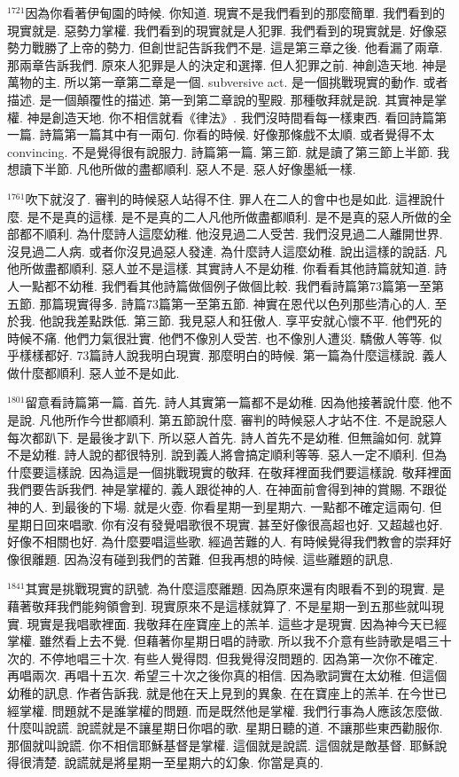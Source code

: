 \documentclass{book}
\begin{document}
$^{1721}$因為你看著伊甸園的時候.
你知道.
現實不是我們看到的那麼簡單.
我們看到的現實就是.
惡勢力掌權.
我們看到的現實就是人犯罪.
我們看到的現實就是.
好像惡勢力戰勝了上帝的勢力.
但創世記告訴我們不是.
這是第三章之後.
他看漏了兩章.
那兩章告訴我們.
原來人犯罪是人的決定和選擇.
但人犯罪之前.
神創造天地.
神是萬物的主.
所以第一章第二章是一個.
subversive act.
是一個挑戰現實的動作.
或者描述.
是一個顛覆性的描述.
第一到第二章說的聖殿.
那種敬拜就是說.
其實神是掌權.
神是創造天地.
你不相信就看《律法》.
我們沒時間看每一樣東西.
看回詩篇第一篇.
詩篇第一篇其中有一兩句.
你看的時候.
好像那條戲不太順.
或者覺得不太convincing.
不是覺得很有說服力.
詩篇第一篇.
第三節.
就是讀了第三節上半節.
我想讀下半節.
凡他所做的盡都順利.
惡人不是.
惡人好像墨紙一樣.

$^{1761}$吹下就沒了.
審判的時候惡人站得不住.
罪人在二人的會中也是如此.
這裡說什麼.
是不是真的這樣.
是不是真的二人凡他所做盡都順利.
是不是真的惡人所做的全部都不順利.
為什麼詩人這麼幼稚.
他沒見過二人受苦.
我們沒見過二人離開世界.
沒見過二人病.
或者你沒見過惡人發達.
為什麼詩人這麼幼稚.
說出這樣的說話.
凡他所做盡都順利.
惡人並不是這樣.
其實詩人不是幼稚.
你看看其他詩篇就知道.
詩人一點都不幼稚.
我們看其他詩篇做個例子做個比較.
我們看詩篇第73篇第一至第五節.
那篇現實得多.
詩篇73篇第一至第五節.
神實在恩代以色列那些清心的人.
至於我.
他說我差點跌低.
第三節.
我見惡人和狂傲人.
享平安就心懷不平.
他們死的時候不痛.
他們力氣很壯實.
他們不像別人受苦.
也不像別人遭災.
驕傲人等等.
似乎樣樣都好.
73篇詩人說我明白現實.
那麼明白的時候.
第一篇為什麼這樣說.
義人做什麼都順利.
惡人並不是如此.

$^{1801}$留意看詩篇第一篇.
首先.
詩人其實第一篇都不是幼稚.
因為他接著說什麼.
他不是說.
凡他所作今世都順利.
第五節說什麼.
審判的時候惡人才站不住.
不是說惡人每次都趴下.
是最後才趴下.
所以惡人首先.
詩人首先不是幼稚.
但無論如何.
就算不是幼稚.
詩人說的都很特別.
說到義人將會搞定順利等等.
惡人一定不順利.
但為什麼要這樣說.
因為這是一個挑戰現實的敬拜.
在敬拜裡面我們要這樣說.
敬拜裡面我們要告訴我們.
神是掌權的.
義人跟從神的人.
在神面前會得到神的賞賜.
不跟從神的人.
到最後的下場.
就是火壺.
你看星期一到星期六.
一點都不確定這兩句.
但星期日回來唱歌.
你有沒有發覺唱歌很不現實.
甚至好像很高超也好.
又超越也好.
好像不相關也好.
為什麼要唱這些歌.
經過苦難的人.
有時候覺得我們教會的崇拜好像很離題.
因為沒有碰到我們的苦難.
但我再想的時候.
這些離題的訊息.

$^{1841}$其實是挑戰現實的訊號.
為什麼這麼離題.
因為原來還有肉眼看不到的現實.
是藉著敬拜我們能夠領會到.
現實原來不是這樣就算了.
不是星期一到五那些就叫現實.
現實是我唱歌裡面.
我敬拜在座寶座上的羔羊.
這些才是現實.
因為神今天已經掌權.
雖然看上去不覺.
但藉著你星期日唱的詩歌.
所以我不介意有些詩歌是唱三十次的.
不停地唱三十次.
有些人覺得悶.
但我覺得沒問題的.
因為第一次你不確定.
再唱兩次.
再唱十五次.
希望三十次之後你真的相信.
因為歌詞實在太幼稚.
但這個幼稚的訊息.
作者告訴我.
就是他在天上見到的異象.
在在寶座上的羔羊.
在今世已經掌權.
問題就不是誰掌權的問題.
而是既然他是掌權.
我們行事為人應該怎麼做.
什麼叫說謊.
說謊就是不讓星期日你唱的歌.
星期日聽的道.
不讓那些東西勸服你.
那個就叫說謊.
你不相信耶穌基督是掌權.
這個就是說謊.
這個就是敵基督.
耶穌說得很清楚.
說謊就是將星期一至星期六的幻象.
你當是真的.
\end{document}
